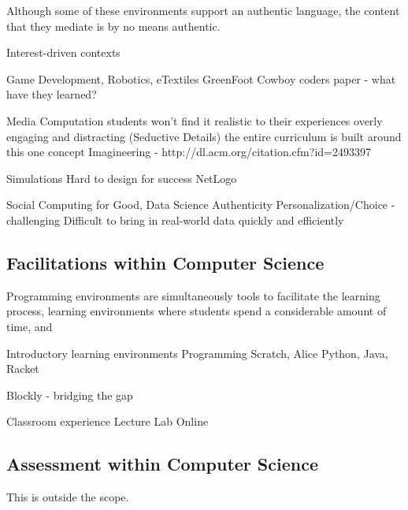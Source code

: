Although some of these environments support an authentic language, the content that they mediate is by no means authentic. 
 
Interest-driven contexts

Game Development, Robotics, eTextiles
GreenFoot
Cowboy coders paper - what have they learned?

Media Computation
students won't find it realistic to their experiences
overly engaging and distracting (Seductive Details)
the entire curriculum is built around this one concept
Imagineering - http://dl.acm.org/citation.cfm?id=2493397

Simulations
Hard to design for success
NetLogo

Social Computing for Good, Data Science
Authenticity
Personalization/Choice - challenging
Difficult to bring in real-world data quickly and efficiently
	
\subsection{Facilitations within Computer Science}

Programming environments are simultaneously tools to facilitate the learning process, learning environments where students spend a considerable amount of time, and 

Introductory learning environments
Programming
Scratch, Alice
Python, Java, Racket

Blockly - bridging the gap

Classroom experience
Lecture
Lab
Online

\subsection{Assessment within Computer Science}

This is outside the scope.

